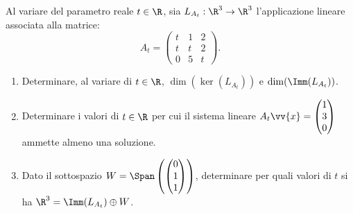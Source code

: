 \begin{tcolorbox}[colback=white, colframe=navyblue, title={\textbf{Testo del Problema 2 — Applicazione Lineare Parametrica}}]
Al variare del parametro reale $t \in \R$, sia $L_{A_t}: \R^3 \to \R^3$ l'applicazione lineare associata alla matrice:
\begin{equation}
    A_t = \begin{pmatrix}
        t & 1 & 2 \\
        t & t & 2 \\
        0 & 5 & t
    \end{pmatrix}.
\end{equation}
\begin{enumerate}[label=(\roman*)]
    \item Determinare, al variare di $t \in \R$, $\dim(\ker(L_{A_t}))$ e $\dim(\Imm(L_{A_t}))$.
    \item Determinare i valori di $t \in \R$ per cui il sistema lineare $A_t \vv{x} = \begin{pmatrix} 1 \\ 3 \\ 0 \end{pmatrix}$ ammette almeno una soluzione.
    \item Dato il sottospazio $W = \Span\left( \begin{pmatrix} 0 \\ 1 \\ 1 \end{pmatrix} \right)$, determinare per quali valori di $t$ si ha $\R^3 = \Imm(L_{A_t}) \oplus W$.
\end{enumerate}
\end{tcolorbox}

